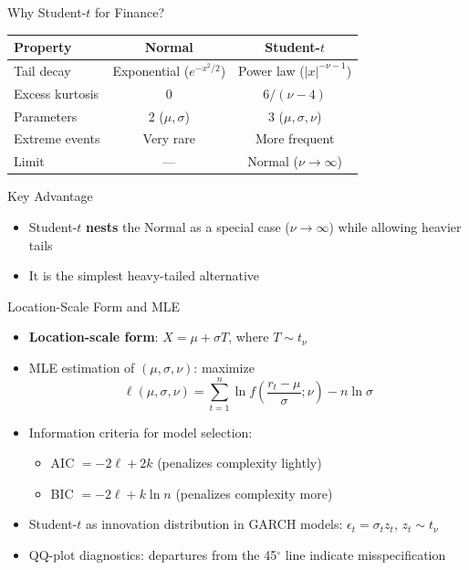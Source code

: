 \documentclass[9pt, aspectratio=169, t]{beamer}
\theoremstyle{definition}
\begin{document}
\begin{frame}{Why Student-$t$ for Finance?}
\begin{center}
\renewcommand{\arraystretch}{1.2}
\begin{tabular}{lcc}
\toprule
\textbf{Property} & \textbf{Normal} & \textbf{Student-$t$} \\
\midrule
Tail decay & Exponential ($e^{-x^2/2}$) & Power law ($|x|^{-\nu-1}$) \\
Excess kurtosis & 0 & $6/(\nu-4)$ \\
Parameters & 2 ($\mu, \sigma$) & 3 ($\mu, \sigma, \nu$) \\
Extreme events & Very rare & More frequent \\
Limit & --- & Normal ($\nu \to \infty$) \\
\bottomrule
\end{tabular}
\end{center}

\vspace{0.3cm}
\begin{block}{Key Advantage}
\begin{itemize}
\item Student-$t$ \textbf{nests} the Normal as a special case ($\nu \to \infty$) while allowing heavier tails
\item It is the simplest heavy-tailed alternative
\end{itemize}
\end{block}
\end{frame}

\begin{frame}{Location-Scale Form and MLE}
\begin{itemize}
\item \textbf{Location-scale form}: $X = \mu + \sigma T$, where $T \sim t_\nu$
\item MLE estimation of $(\mu, \sigma, \nu)$: maximize
\[
\ell(\mu,\sigma,\nu) = \sum_{t=1}^{n} \ln f\!\left(\frac{r_t - \mu}{\sigma}; \nu\right) - n\ln\sigma
\]
\item Information criteria for model selection:
\begin{itemize}
\item AIC $= -2\ell + 2k$ (penalizes complexity lightly)
\item BIC $= -2\ell + k\ln n$ (penalizes complexity more)
\end{itemize}
\item Student-$t$ as innovation distribution in GARCH models: $\epsilon_t = \sigma_t z_t$, $z_t \sim t_\nu$
\item QQ-plot diagnostics: departures from the 45$^\circ$ line indicate misspecification
\end{itemize}
\end{frame}
\end{document}
